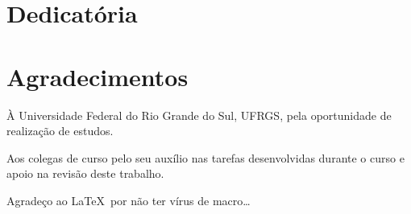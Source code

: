 \documentclass[repeatfields,xlists,xpacks,oneside,yearsonly]{ufrgscca}
\begin{document}
\maketitle


\notoc\chapter{Dedicatória} %



\notoc\chapter{Agradecimentos}

\`{A} Universidade Federal do Rio Grande do Sul, UFRGS, pela
oportunidade de realização de estudos.

Aos colegas de curso pelo seu auxílio nas tarefas desenvolvidas durante o
curso e apoio na revisão deste trabalho.

Agradeço ao \LaTeX\ por não ter vírus de macro\ldots
\end{document}

